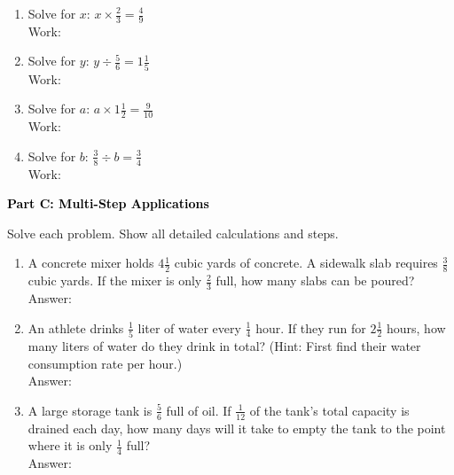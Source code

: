 \documentclass[12pt, letterpaper, fleqn]{article}
\newcommand{\blanklong}{\underline{\hspace{6.5cm}}}
\begin{document}
\vspace{5mm}
\begin{enumerate}[itemsep=2.0cm, leftmargin=0.6cm]
\item Solve for $x$: $x \times \frac{2}{3} = \frac{4}{9}$ \\
Work: \blanklong

\item Solve for $y$: $y \div \frac{5}{6} = 1\frac{1}{5}$ \\
Work: \blanklong

\item Solve for $a$: $a \times 1\frac{1}{2} = \frac{9}{10}$ \\
Work: \blanklong

\item Solve for $b$: $\frac{3}{8} \div b = \frac{3}{4}$ \\
Work: \blanklong
\end{enumerate}
\newpage

\begin{tcolorbox}[colback=black!10]
    \large\textcolor{black}{\textbf{Part C: Multi-Step Applications}}
\end{tcolorbox}

\vspace{3mm}
\noindent
Solve each problem. Show all detailed calculations and steps.

\vspace{5mm}
\begin{enumerate}[itemsep=2.2cm, leftmargin=0.6cm]
\item A concrete mixer holds $4\frac{1}{2}$ cubic yards of concrete. A sidewalk slab requires $\frac{3}{8}$ cubic yards. If the mixer is only $\frac{2}{3}$ full, how many slabs can be poured? \\
Answer: \blanklong

\item An athlete drinks $\frac{1}{5}$ liter of water every $\frac{1}{4}$ hour. If they run for $2\frac{1}{2}$ hours, how many liters of water do they drink in total? (Hint: First find their water consumption rate per hour.) \\
Answer: \blanklong

\item A large storage tank is $\frac{5}{6}$ full of oil. If $\frac{1}{12}$ of the tank's total capacity is drained each day, how many days will it take to empty the tank to the point where it is only $\frac{1}{4}$ full? \\
Answer: \blanklong
\end{enumerate}
\newpage
\end{document}
